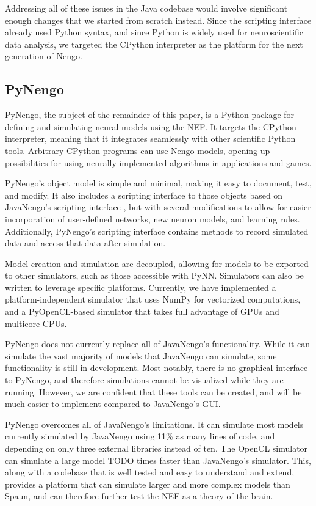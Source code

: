 \documentclass{frontiersSCNS}
\begin{document}
Addressing all of these issues
in the Java codebase would involve
significant enough changes
that we started from scratch instead.
Since the scripting interface
already used Python syntax,
and since Python is widely used
for neuroscientific data analysis,
we targeted the CPython interpreter
as the platform for the next generation of Nengo.

\subsection{PyNengo}

PyNengo,
the subject of the remainder of this paper,
is a Python package for
defining and simulating
neural models using the NEF.
It targets the CPython interpreter,
meaning that it integrates seamlessly
with other scientific Python tools.
Arbitrary CPython programs
can use Nengo models,
opening up possibilities
for using neurally implemented algorithms
in applications and games.

PyNengo's object model is simple and minimal,
making it easy to
document, test, and modify.
It also includes a scripting interface to those objects
based on JavaNengo's scripting interface \cite{TODO},
but with several modifications
to allow for easier incorporation
of user-defined networks,
new neuron models, and learning rules.
Additionally, PyNengo's scripting interface
contains methods to record simulated data
and access that data after simulation.

Model creation and simulation are decoupled,
allowing for models to be exported
to other simulators,
such as those accessible with PyNN.
Simulators can also be written
to leverage specific platforms.
Currently, we have implemented
a platform-independent simulator
that uses NumPy for vectorized computations,
and a PyOpenCL-based
simulator that takes full advantage of GPUs
and multicore CPUs.

PyNengo does not currently
replace all of JavaNengo's functionality.
While it can simulate the vast majority
of models that JavaNengo can simulate,
some functionality is still in development.
Most notably, there is no graphical interface
to PyNengo, and therefore simulations
cannot be visualized while they are running.
However, we are confident that these tools
can be created, and will be much easier
to implement compared to JavaNengo's GUI.

PyNengo overcomes all of JavaNengo's limitations.
It can simulate most models
currently simulated by JavaNengo
using 11\% as many lines of code,
and depending on
only three external libraries instead of ten.
The OpenCL simulator can simulate
a large model TODO times
faster than JavaNengo's simulator.
This, along with a codebase
that is well tested and
easy to understand and extend,
provides a platform
that can simulate larger and more complex
models than Spaun,
and can therefore further
test the NEF as a theory of the brain.
\end{document}
